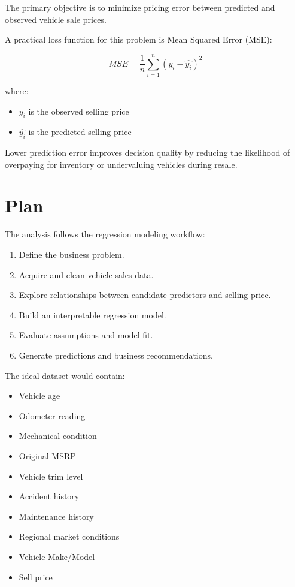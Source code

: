 \documentclass[
  12pt]{article}
\providecommand{\tightlist}{%
  \setlength{\itemsep}{0pt}\setlength{\parskip}{0pt}}
\begin{document}
The primary objective is to minimize pricing error between predicted and
observed vehicle sale prices.

A practical loss function for this problem is Mean Squared Error (MSE):

\[
MSE=\frac{1}{n}\sum_{i=1}^{n}(y_i-\hat{y_i})^2
\]

where:

\begin{itemize}
\tightlist
\item
  \(y_i\) is the observed selling price
\item
  \(\hat{y_i}\) is the predicted selling price
\end{itemize}

Lower prediction error improves decision quality by reducing the
likelihood of overpaying for inventory or undervaluing vehicles during
resale.

\section{Plan}\label{sec-plan}

The analysis follows the regression modeling workflow:

\begin{enumerate}
\def\labelenumi{\arabic{enumi}.}
\tightlist
\item
  Define the business problem.
\item
  Acquire and clean vehicle sales data.
\item
  Explore relationships between candidate predictors and selling price.
\item
  Build an interpretable regression model.
\item
  Evaluate assumptions and model fit.
\item
  Generate predictions and business recommendations.
\end{enumerate}

The ideal dataset would contain:

\begin{itemize}
\tightlist
\item
  Vehicle age
\item
  Odometer reading
\item
  Mechanical condition
\item
  Original MSRP
\item
  Vehicle trim level
\item
  Accident history
\item
  Maintenance history
\item
  Regional market conditions
\item
  Vehicle Make/Model
\item
  Sell price
\end{itemize}
\end{document}
